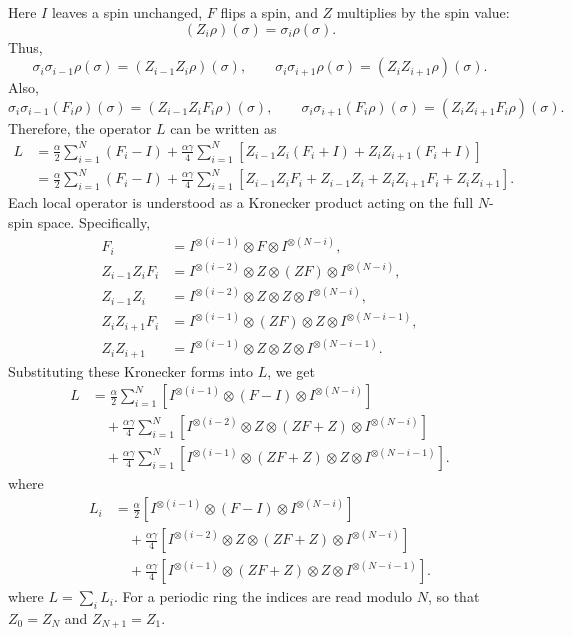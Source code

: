 \documentclass[12pt]{article}
\theoremstyle{definition}
\theoremstyle{remark}
\begin{document}
Here \(I\) leaves a spin unchanged, \(F\) flips a spin, and \(Z\) multiplies by the spin value:
\[
(Z_i\rho)(\sigma)=\sigma_i\rho(\sigma).
\]
Thus,
\[
\sigma_i\sigma_{i-1}\rho(\sigma)
=
(Z_{i-1}Z_i\rho)(\sigma),
\qquad
\sigma_i\sigma_{i+1}\rho(\sigma)
=
(Z_iZ_{i+1}\rho)(\sigma).
\]
Also,
\[
\sigma_i\sigma_{i-1}(F_i\rho)(\sigma)
=
(Z_{i-1}Z_iF_i\rho)(\sigma),
\qquad
\sigma_i\sigma_{i+1}(F_i\rho)(\sigma)
=
(Z_iZ_{i+1}F_i\rho)(\sigma).
\]
Therefore, the operator \(L\) can be written as
\begin{align*}
L
&=
\frac{\alpha}{2}
\sum_{i=1}^N
(F_i-I)
+
\frac{\alpha\gamma}{4}
\sum_{i=1}^N
\left[
Z_{i-1}Z_i(F_i+I)
+
Z_iZ_{i+1}(F_i+I)
\right] \\[4pt]
&=
\frac{\alpha}{2}
\sum_{i=1}^N
(F_i-I)
+
\frac{\alpha\gamma}{4}
\sum_{i=1}^N
\left[
Z_{i-1}Z_iF_i
+
Z_{i-1}Z_i
+
Z_iZ_{i+1}F_i
+
Z_iZ_{i+1}
\right].
\end{align*}
Each local operator is understood as a Kronecker product acting on the full \(N\)-spin space. Specifically,
\begin{align*}
F_i
&=
I^{\otimes(i-1)}
\otimes F
\otimes I^{\otimes(N-i)}, \\[4pt]
Z_{i-1}Z_iF_i
&=
I^{\otimes(i-2)}
\otimes Z
\otimes (ZF)
\otimes I^{\otimes(N-i)}, \\[4pt]
Z_{i-1}Z_i
&=
I^{\otimes(i-2)}
\otimes Z
\otimes Z
\otimes I^{\otimes(N-i)}, \\[4pt]
Z_iZ_{i+1}F_i
&=
I^{\otimes(i-1)}
\otimes (ZF)
\otimes Z
\otimes I^{\otimes(N-i-1)}, \\[4pt]
Z_iZ_{i+1}
&=
I^{\otimes(i-1)}
\otimes Z
\otimes Z
\otimes I^{\otimes(N-i-1)}.
\end{align*}
Substituting these Kronecker forms into \(L\), we get
\begin{align*}
L
&=
\frac{\alpha}{2}
\sum_{i=1}^N
\left[
I^{\otimes(i-1)}
\otimes (F-I)
\otimes I^{\otimes(N-i)}
\right] \\[4pt]
&\quad
+
\frac{\alpha\gamma}{4}
\sum_{i=1}^N
\left[
I^{\otimes(i-2)}
\otimes Z
\otimes (ZF+Z)
\otimes I^{\otimes(N-i)}
\right] \\[4pt]
&\quad
+
\frac{\alpha\gamma}{4}
\sum_{i=1}^N
\left[
I^{\otimes(i-1)}
\otimes (ZF+Z)
\otimes Z
\otimes I^{\otimes(N-i-1)}
\right].
\end{align*}
where 
\begin{align*}
L_i
&=
\frac{\alpha}{2}
\left[
I^{\otimes(i-1)}
\otimes (F-I)
\otimes I^{\otimes(N-i)}
\right] \\[4pt]
&\quad
+
\frac{\alpha\gamma}{4}
\left[
I^{\otimes(i-2)}
\otimes Z
\otimes (ZF+Z)
\otimes I^{\otimes(N-i)}
\right] \\[4pt]
&\quad
+
\frac{\alpha\gamma}{4}
\left[
I^{\otimes(i-1)}
\otimes (ZF+Z)
\otimes Z
\otimes I^{\otimes(N-i-1)}
\right].
\end{align*}
where $L = \sum_i L_i$. For a periodic ring the indices are read modulo \(N\), so that $Z_0 = Z_N$ and $Z_{N+1} = Z_1$.
\end{document}
